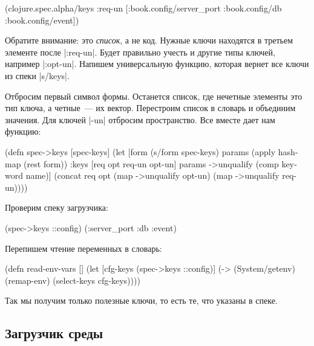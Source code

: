 \begin{english}
  \begin{clojure}
(clojure.spec.alpha/keys
 :req-un [:book.config/server_port
          :book.config/db
          :book.config/event])
  \end{clojure}
\end{english}

Обратите внимание: это \emph{список}, а не код. Нужные ключи находятся в третьем
элементе после \spverb|:req-un|. Будет правильно учесть и другие типы ключей,
например \spverb|:opt-un|. Напишем универсальную функцию, которая вернет все
ключи из спеки \spverb|s/keys|.

Отбросим первый символ формы. Останется список, где нечетные элементы это тип
ключа, а четные~--- их вектор. Перестроим список в словарь и объединим
значения. Для ключей \spverb|-un| отбросим пространство. Все вместе дает нам
функцию:

\begin{english}
  \begin{clojure}
(defn spec->keys
  [spec-keys]
  (let [form (s/form spec-keys)
        params (apply hash-map (rest form))
        {:keys [req opt req-un opt-un]} params
        ->unqualify (comp keyword name)]
    (concat req
            opt
            (map ->unqualify opt-un)
            (map ->unqualify req-un))))
  \end{clojure}
\end{english}

\noindent
Проверим спеку загрузчика:

\begin{english}
  \begin{clojure}
(spec->keys ::config)
(:server_port :db :event)
  \end{clojure}
\end{english}

\noindent
Перепишем чтение переменных в словарь:

\begin{english}
  \begin{clojure}
(defn read-env-vars []
  (let [cfg-keys (spec->keys ::config)]
    (-> (System/getenv)
        (remap-env)
        (select-keys cfg-keys))))
  \end{clojure}
\end{english}

\noindent
Так мы получим только полезные ключи, то есть те, что указаны в спеке.

\subsection{Загрузчик среды}

